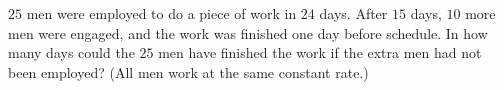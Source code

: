 $25$ men were employed to do a piece of work in $24$ days. After $15$ days, $10$ more men were engaged, and the work was finished one day before schedule. In how many days could the $25$ men have finished the work if the extra men had not been employed? (All men work at the same constant rate.)
